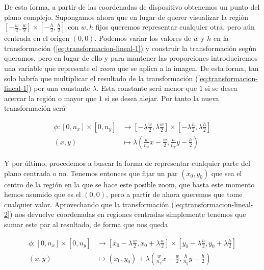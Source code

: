De esta forma, a partir de las coordenadas de dispositivo obtenemos un punto del plano complejo. Supongamos ahora que en lugar de querer visualizar la región $\left[-\frac{w}{2},\frac{w}{2}\right]\times\left[-\frac{h}{2},\frac{h}{2}\right]$ con $w,h$ fijos queremos representar cualquier otra, pero aún centrada en el origen $(0,0)$. Podemos variar los valores de $w$ y $h$ en la transformación (\ref{eq:transformacion-lineal-1}) y construir la transformación según queramos, pero en lugar de ello y para mantener las proporciones introduciremos una variable que represente el \textit{zoom} que se aplica a la imagen. De esta forma, tan solo habría que multiplicar el resultado de la transformación (\ref{eq:transformacion-lineal-1}) por una constante $\lambda$. Esta constante será menor que $1$ si se desea acercar la región o mayor que $1$ si se desea alejar. Por tanto la nueva transformación será

\begin{equation}
    \label{eq:transformacion-lineal-2}
    \begin{split}
        \phi:[0,n_x]\times[0,n_y] & \longrightarrow \left[-\lambda\frac{w}{2},\lambda\frac{w}{2}\right]\times\left[-\lambda\frac{h}{2},\lambda\frac{h}{2}\right] \\
        (x,y) & \longmapsto \lambda\left(\frac{w}{n_x}x-\frac{w}{2},\frac{h}{n_y}y-\frac{h}{2}\right)
    \end{split}
\end{equation}

Y por último, procedemos a buscar la forma de representar cualquier parte del plano centrada o no. Tenemos entonces que fijar un par $(x_0,y_0)$ que sea el centro de la región en la que se hace este posible zoom, que hasta este momento hemos asumido que es el $(0,0)$, pero a partir de ahora queremos que tome cualquier valor. Aprovechando que la transformación (\ref{eq:transformacion-lineal-2}) nos devuelve coordenadas en regiones centradas simplemente tenemos que sumar este par al resultado, de forma que nos queda 

\begin{equation}
    \label{eq:transformacion-lineal-3}
    \begin{split}
        \phi:[0,n_x]\times[0,n_y] & \longrightarrow \left[x_0-\lambda\frac{w}{2},x_0+\lambda\frac{w}{2}\right]\times\left[y_0-\lambda\frac{h}{2},y_0+\lambda\frac{h}{2}\right] \\
        (x,y) & \longmapsto (x_0,y_0) + \lambda\left(\frac{w}{n_x}x-\frac{w}{2},\frac{h}{n_y}y-\frac{h}{2}\right)
    \end{split}
\end{equation}

